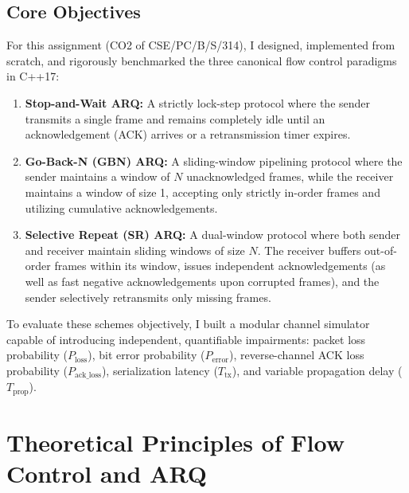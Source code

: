 \documentclass[11pt,a4paper]{article}
\begin{document}
\subsection{Core Objectives}
For this assignment (CO2 of CSE/PC/B/S/314), I designed, implemented from scratch, and rigorously benchmarked the three canonical flow control paradigms in C++17:
\begin{enumerate}
    \item \textbf{Stop-and-Wait ARQ:} A strictly lock-step protocol where the sender transmits a single frame and remains completely idle until an acknowledgement (ACK) arrives or a retransmission timer expires.
    \item \textbf{Go-Back-N (GBN) ARQ:} A sliding-window pipelining protocol where the sender maintains a window of $N$ unacknowledged frames, while the receiver maintains a window of size 1, accepting only strictly in-order frames and utilizing cumulative acknowledgements.
    \item \textbf{Selective Repeat (SR) ARQ:} A dual-window protocol where both sender and receiver maintain sliding windows of size $N$. The receiver buffers out-of-order frames within its window, issues independent acknowledgements (as well as fast negative acknowledgements upon corrupted frames), and the sender selectively retransmits only missing frames.
\end{enumerate}

To evaluate these schemes objectively, I built a modular channel simulator capable of introducing independent, quantifiable impairments: packet loss probability ($P_{\text{loss}}$), bit error probability ($P_{\text{error}}$), reverse-channel ACK loss probability ($P_{\text{ack\_loss}}$), serialization latency ($T_{\text{tx}}$), and variable propagation delay ($T_{\text{prop}}$).

\FloatBarrier
\section{Theoretical Principles of Flow Control and ARQ}
\end{document}
